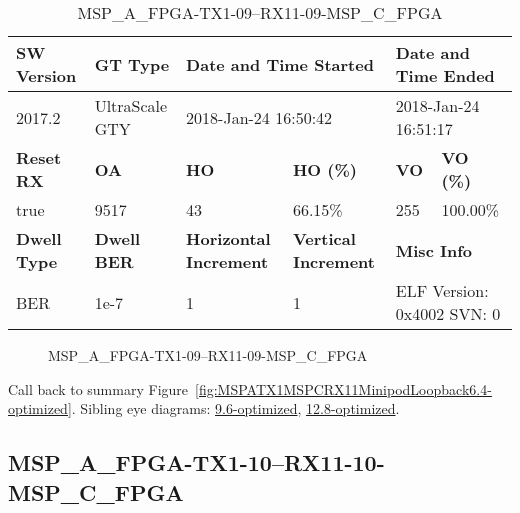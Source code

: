 \begin{table}[h]
\centering
\caption{MSP\_A\_FPGA-TX1-09--RX11-09-MSP\_C\_FPGA}
\label{tab:MSPAFPGATX109RX1109MSPCFPGA6.4-optimized}
\begin{tabular}{@{}|l|l|l|l|l|l|@{}}
\toprule
\textbf{SW Version}                & \textbf{GT Type}   & \multicolumn{2}{l|}{\textbf{Date and Time Started}}            & \multicolumn{2}{l|}{\textbf{Date and Time Ended}}        \\ \midrule
2017.2                       & UltraScale GTY          & \multicolumn{2}{l|}{2018-Jan-24 16:50:42}                   & \multicolumn{2}{l|}{2018-Jan-24 16:51:17}               \\ \midrule
\textbf{Reset RX}                  & \textbf{OA} & \textbf{HO}   & \textbf{HO (\%)} & \textbf{VO} & \textbf{VO (\%)} \\ \midrule
true & 9517        & 43          & 66.15\%        & 255        & 100.00\%       \\ \midrule
\textbf{Dwell Type}                & \textbf{Dwell BER} & \textbf{Horizontal Increment} & \textbf{Vertical Increment}    & \multicolumn{2}{l|}{\textbf{Misc Info}}                  \\ \midrule
BER                            & 1e-7        & 1        & 1           & \multicolumn{2}{l|}{ELF Version: 0x4002 SVN: 0}                         \\ \bottomrule
\end{tabular}
\end{table}

\begin{figure}[h]
\caption{MSP\_A\_FPGA-TX1-09--RX11-09-MSP\_C\_FPGA} \label{fig:MSPAFPGATX109RX1109MSPCFPGA6.4-optimized}
\end{figure}

Call back to summary Figure~\ref{fig:MSPATX1MSPCRX11MinipodLoopback6.4-optimized}.
Sibling eye diagrams: \hyperref[sec:MSPAFPGATX109RX1109MSPCFPGA9.6-optimized]{9.6-optimized}, \hyperref[sec:MSPAFPGATX109RX1109MSPCFPGA12.8-optimized]{12.8-optimized}.

\clearpage
\newpage


\subsection{MSP\_A\_FPGA-TX1-10--RX11-10-MSP\_C\_FPGA}\label{sec:MSPAFPGATX110RX1110MSPCFPGA6.4-optimized}

